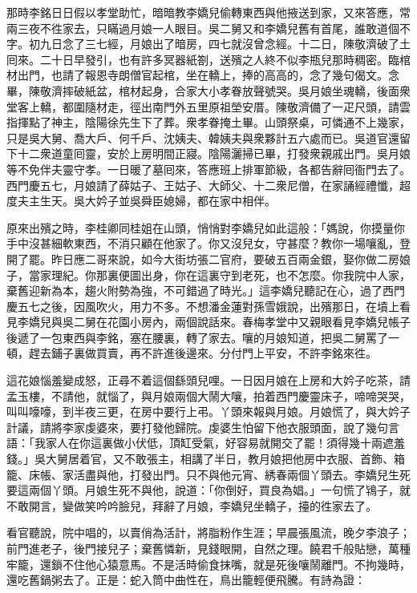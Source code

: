 那時李銘日日假以孝堂助忙，暗暗教李嬌兒偷轉東西與他掖送到家，又來答應，常兩三夜不徃家去，只瞞過月娘一人眼目。吳二舅又和李嬌兒舊有首尾，誰敢道個不字。初九日念了三七經，月娘出了暗房，四七就沒曾念經。十二日，陳敬濟破了土囘來。二十日早發引，也有許多冥器紙劄，送殯之人終不似李瓶兒那時稠密。臨棺材出門，也請了報恩寺朗僧官起棺，坐在轎上，捧的高高的，念了幾句偈文。念畢，陳敬濟摔破紙盆，棺材起身，合家大小孝眷放聲號哭。吳月娘坐魂轎，後面衆堂客上轎，都圍隨材走，徑出南門外五里原祖塋安厝。陳敬濟備了一疋尺頭，請雲指揮點了神主，陰陽徐先生下了葬。衆孝眷掩土畢。山頭祭桌，可憐通不上幾家，只是吳大舅、喬大戶、何千戶、沈姨夫、韓姨夫與衆夥計五六處而已。吳道官還留下十二衆道童囘靈，安於上房明間正寢。陰陽灑掃已畢，打發衆親戚出門。吳月娘等不免伴夫靈守孝。一日暖了墓囘來，答應班上排軍節級，各都告辭囘衙門去了。西門慶五七，月娘請了薛姑子、王姑子、大師父、十二衆尼僧，在家誦經禮懺，超度夫主生天。吳大妗子並吳舜臣媳婦，都在家中相伴。

原來出殯之時，李桂卿同桂姐在山頭，悄悄對李嬌兒如此這般：「媽說，你摸量你手中沒甚細軟東西，不消只顧在他家了。你又沒兒女，守甚麼？教你一場嚷亂，登開了罷。{}昨日應二哥來說，如今大街坊張二官府，要破五百兩金銀，娶你做二房娘子，當家理紀。你那裏便圖出身，你在這裏守到老死，也不怎麼。你我院中人家，棄舊迎新為本，趨火附勢為強，不可錯過了時光。」這李嬌兒聽記在心，過了西門慶五七之後，因風吹火，用力不多。不想潘金蓮對孫雪娥說，出殯那日，在墳上看見李嬌兒與吳二舅在花園小房內，兩個說話來。春梅孝堂中又親眼看見李嬌兒帳子後遞了一包東西與李銘，塞在腰裏，轉了家去。{}嚷的月娘知道，把吳二舅罵了一頓，趕去鋪子裏做買賣，再不許進後邊來。分付門上平安，不許李銘來徃。

這花娘惱羞變成怒，正尋不着這個繇頭兒哩。一日因月娘在上房和大妗子吃茶，請孟玉樓，不請他，就惱了，與月娘兩個大鬧大嚷，拍着西門慶靈床子，啼啼哭哭，叫叫嚎嚎，到半夜三更，在房中要行上弔。丫頭來報與月娘。月娘慌了，與大妗子計議，請將李家虔婆來，要打發他歸院。虔婆生怕留下他衣服頭面，說了幾句言語：「我家人在你這裏做小伏低，頂缸受氣，好容易就開交了罷！須得幾十兩遮羞錢。」{}吳大舅居着官，又不敢張主，相講了半日，教月娘把他房中衣服、首飾、箱籠、床帳、家活盡與他，打發出門。只不與他元宵、綉春兩個丫頭去。李嬌兒生死要這兩個丫頭。月娘生死不與他，說道：「你倒好，買良為娼。」一句慌了鴇子，就不敢開言，變做笑吟吟臉兒，拜辭了月娘，李嬌兒坐轎子，擡的徃家去了。

看官聽說，院中唱的，以賣俏為活計，將脂粉作生涯；早晨張風流，晚夕李浪子；前門進老子，後門接兒子；棄舊憐新，見錢眼開，自然之理。饒君千般貼戀，萬種牢籠，還鎖不住他心猿意馬。不是活時偷食抹嘴，就是死後嚷鬧離門。不拘幾時，還吃舊鍋粥去了。正是：蛇入筒中曲性在，鳥出籠輕便飛騰。有詩為證：

